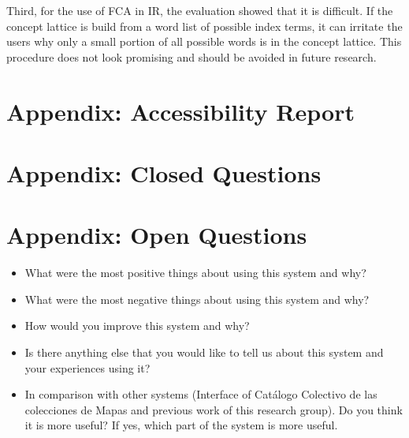 \documentclass[11pt]{report}
\begin{document}
Third, for the use of FCA in IR, the evaluation showed that it is difficult. If the concept lattice is build from a word list of possible index terms, it can irritate the users why only a small portion of all possible words is in the concept lattice. This procedure does not look promising and should be avoided in future research.
\newpage



\newpage
\appendix
\chapter{Appendix: Accessibility Report}
\label{app:access}



\chapter{Appendix: Closed Questions}
\label{app:closed}



\chapter{Appendix: Open Questions}
\label{app:open}

\begin{itemize}
	\item What were the most positive things about using this system and why?
	\item What were the most negative things about using this system and why?
	\item How would you improve this system and why?
	\item Is there anything else that you would like to tell us about this system and your experiences using it?
	\item In comparison with other systems (Interface of Catálogo Colectivo de las colecciones de Mapas and previous work of this research group).
Do you think it is more useful? If yes, which part of the system is more useful.
\end{itemize}
\end{document}
